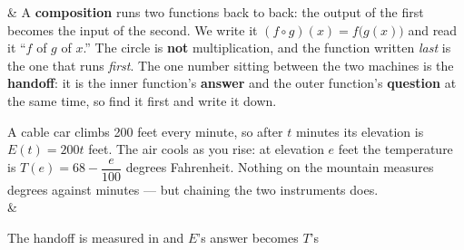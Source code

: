 \documentclass[10pt]{article}
\begin{document}
\small
\begin{guidednotes}
 &
A \textbf{composition} runs two functions back to back: the output of the first becomes the
input of the second. We write it $(f \circ g)(x) = f\big(g(x)\big)$ and read it ``$f$ of $g$ of
$x$.'' The circle is \textbf{not} multiplication, and the function written \emph{last} is the one
that runs \emph{first}. The one number sitting between the two machines is the \textbf{handoff}:
it is the inner function's \textbf{answer} and the outer function's \textbf{question} at the same
time, so find it first and write it down.

\vspace{4pt}
A cable car climbs 200 feet every minute, so after $t$ minutes its elevation is $E(t) = 200t$
feet. The air cools as you rise: at elevation $e$ feet the temperature is
$T(e) = 68 - \dfrac{e}{100}$ degrees Fahrenheit. Nothing on the mountain measures degrees against
minutes --- but chaining the two instruments does.
\\
& \begin{center}
\end{center}
\vspace{2pt}
The handoff is measured in \qquad and $E$'s answer becomes $T$'s 
\\

\end{guidednotes}
\end{document}
